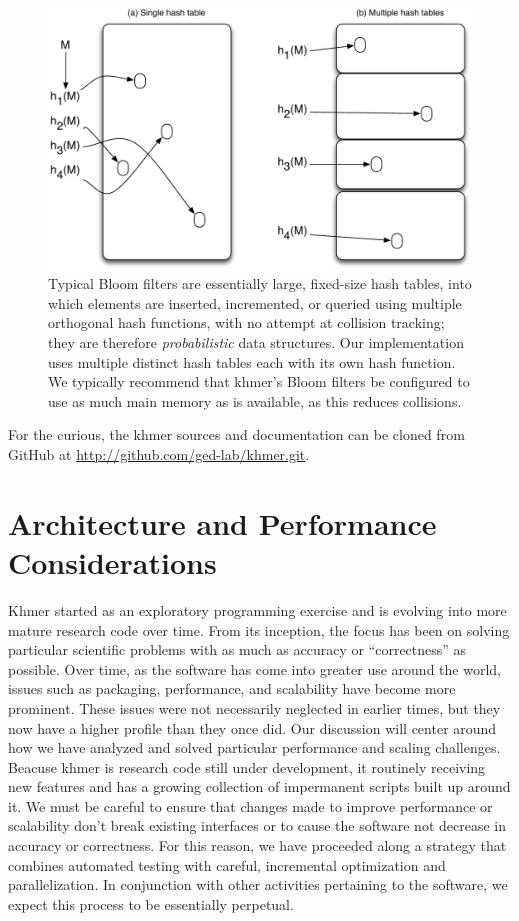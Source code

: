 \documentclass{article}
\begin{document}
\begin{figure}[ht!]
\centering
\includegraphics[scale=0.6]{bloomFilter.pdf}

\caption{Typical Bloom filters are essentially large, fixed-size hash
  tables, into which elements are inserted, incremented, or queried
  using multiple orthogonal hash functions, with no attempt at
  collision tracking; they are therefore {\em probabilistic} data
  structures.  Our implementation uses multiple distinct hash tables
  each with its own hash function.  We typically recommend that
  khmer's Bloom filters be configured to use as much main memory as is
  available, as this reduces collisions.}

\label{bloomFilter}
\end{figure}

For the curious, the khmer sources and documentation can be cloned from GitHub
at \url{http://github.com/ged-lab/khmer.git}.

\section{Architecture and Performance Considerations}

Khmer started as an exploratory programming exercise and is evolving into
more mature research code over time.
From its inception, the focus has been on solving
particular scientific problems with as much as accuracy or ``correctness'' as
possible. Over time, as the software has come into greater use around the
world, issues such as packaging, performance, and scalability have become more
prominent. These issues were not necessarily neglected in earlier times, but
they now have a higher profile than they once did. Our discussion will center
around how we have analyzed and solved particular performance and scaling
challenges.
Beacuse khmer is research code still under development, it routinely
receiving new features and
has a growing collection of impermanent scripts built up around it.  We must
be careful to ensure that changes made to
improve performance or scalability don't break existing
interfaces or to cause the software not decrease in accuracy or
correctness. For this reason, we have proceeded along a strategy that
combines automated testing with careful,
incremental optimization and parallelization. In conjunction with other
activities pertaining to the software, we expect this process to be essentially perpetual.
\end{document}

